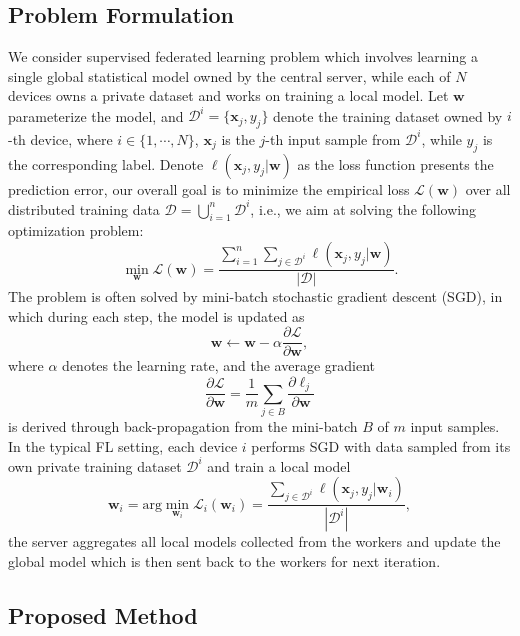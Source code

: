 \documentclass[10pt,twocolumn,letterpaper]{article}
\theoremstyle{definition}
\begin{document}
\subsection{Problem Formulation}
We consider supervised federated learning problem which involves learning a single global statistical model owned by the central server, while each of $N$ devices owns a private dataset and works on training a local model. Let $\mathbf{w}$ parameterize the model, and $\mathcal{D}^i = \{\mathbf{x}_j, y_j\}$ denote the training dataset owned by $i$-th device, where $i\in\{1, \cdots, N\}$, $\mathbf{x}_j$ is the $j$-th input sample from $\mathcal{D}^i$, while $y_j$ is the corresponding label. Denote $\ell (\mathbf{x}_j, y_j | \mathbf{w})$ as the loss function presents the prediction error, our overall goal is to minimize the empirical loss $\mathcal{L}(\mathbf{w})$ over all distributed training data $\mathcal{D} = \bigcup_{i=1}^n \mathcal{D}^i$, i.e., we aim at solving the following optimization problem:
\[
\min\limits_\mathbf{w}  \mathcal{L}(\mathbf{w}) = \frac{ \sum_{i=1}^n \sum_{j\in \mathcal{D}^i} \ell (\mathbf{x}_j, y_j | \mathbf{w}) }{|\mathcal{D}|}.
\]
The problem is often solved by mini-batch stochastic gradient descent (SGD), in which during each step, the model is updated as $$\mathbf{w} \leftarrow \mathbf{w} - \alpha \dfrac{\partial \mathcal{L}}{\partial \mathbf{w}} ,$$ where $\alpha$ denotes the learning rate, and the average gradient $$\dfrac{\partial \mathcal{L}}{\partial \mathbf{w}}= \dfrac{1}{m} \sum_{j \in B} \dfrac{\partial \ell_j }{\partial \mathbf{w}} $$ is derived through back-propagation from the mini-batch $B$ of $m$ input samples. In the typical FL setting, each device $i$ performs SGD with data sampled from its own private training dataset $\mathcal{D}^i$ and train a local model $$\mathbf{w}_i = \text{arg}\min\limits_{\mathbf{w}_i} \mathcal{L}_i(\mathbf{w}_i) = \frac{ \sum_{j\in \mathcal{D}^i} \ell (\mathbf{x}_j, y_j | \mathbf{w}_i) }{|\mathcal{D}^i|} ,$$ 
the server aggregates all local models collected from the workers and update the global model which is then sent back to the workers for next iteration. 

\subsection{Proposed Method} \label{sec:our_method}

\end{document}
